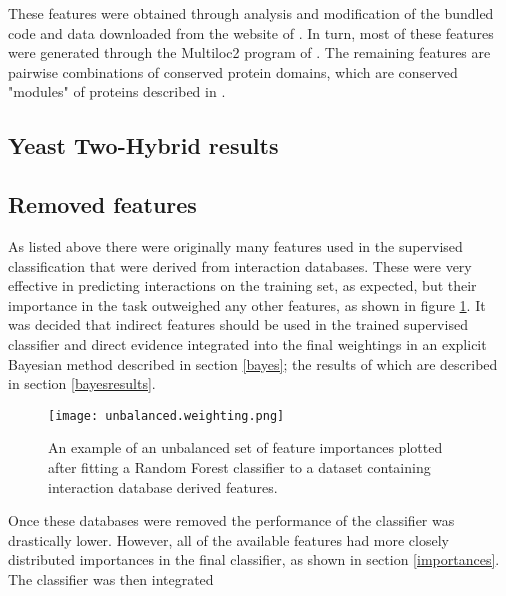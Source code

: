 These features were obtained through analysis and modification of the bundled code and data downloaded from the website of \textcite{rodgers-melnick_predicting_2013}.
In turn, most of these features were generated through the Multiloc2 program of \textcite{blum_multiloc2:_2009}.
The remaining features are pairwise combinations of conserved protein domains, which are conserved "modules" of proteins described in \textcite{janin_domains_1985}.

\subsection{Yeast Two-Hybrid results}
\label{y2h}


\subsection{Removed features}

As listed above there were originally many features used in the supervised classification that were derived from interaction databases.
These were very effective in predicting interactions on the training set, as expected, but their importance in the task outweighed any other features, as shown in figure \ref{fig:unbalanced}.
It was decided that indirect features should be used in the trained supervised classifier and direct evidence integrated into the final weightings in an explicit Bayesian method described in section \ref{bayes}; the results of which are described in section \ref{bayesresults}.

\begin{figure}
    \centering
    \texttt{[image: unbalanced.weighting.png]}
    \caption{An example of an unbalanced set of feature importances plotted after fitting a Random Forest classifier to a dataset containing interaction database derived features.}
    \label{fig:unbalanced}
\end{figure}

Once these databases were removed the performance of the classifier was drastically lower.
However, all of the available features had more closely distributed importances in the final classifier, as shown in section \ref{importances}.
The classifier was then integrated 

